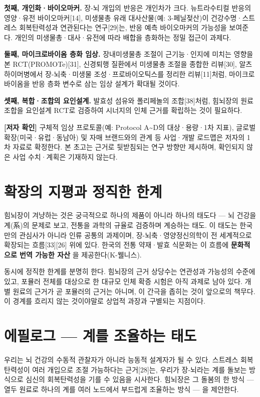 \documentclass[11pt,oneside]{book}
\newenvironment{authnote}
  {\par\smallskip\begingroup\leftskip=7mm\rightskip=5mm\small\color{muted}\noindent\ignorespaces}
  {\par\endgroup\smallskip}
\begin{document}
\textbf{첫째, 개인화·바이오마커.} 장-뇌 개입의 반응은 개인차가 크다. 뉴트라수티컬 반응의 영양·유전 바이오마커[14], 미생물총 유래 대사산물(예: 3-페닐젖산)이 건강수명·스트레스 회복탄력성과 연관된다는 연구[29]는, 반응 예측 바이오마커의 가능성을 보여준다. 개인의 미생물총·대사·유전에 따라 배합을 층화하는 정밀 접근이 과제다.

\textbf{둘째, 마이크로바이옴 층화 임상.} 장내미생물총 조절이 근기능·인지에 미치는 영향을 본 RCT(PROMOTe)[31], 신경퇴행 질환에서 미생물총 조절을 종합한 리뷰[30], 알츠하이머병에서 장-뇌축·미생물 조성·프로바이오틱스를 정리한 리뷰[11]처럼, 마이크로바이옴을 반응 층화 변수로 삼는 임상 설계가 확대될 것이다.

\textbf{셋째, 복합·조합의 요인설계.} 발효성 섬유와 폴리페놀의 조합[38]처럼, 힘뇌장의 원료 조합을 요인설계 RCT로 검증하여 시너지의 인체 근거를 확립하는 것이 필요하다.

\begin{authnote}\textbf{[저자 확인]} 구체적 임상 프로토콜(예: Protocol A\textasciitilde{}D의 대상·용량·1차 지표), 글로벌 확장(미국·유럽·동남아) 및 자매 브랜드와의 관계 등 사업·개발 로드맵은 저자의 1차 자료로 확정한다. 본 초고는 근거로 뒷받침되는 연구 방향만 제시하며, 확인되지 않은 사업 수치·계획은 기재하지 않는다.\end{authnote}
\section{확장의 지평과 정직한 한계}
힘뇌장이 겨냥하는 것은 궁극적으로 하나의 제품이 아니라 하나의 태도다 — 뇌 건강을 계(系)의 문제로 보고, 전통을 과학의 규율로 검증하며 계승하는 태도. 이 태도는 한국만의 관심사가 아니라 인류 공통의 과제이며, 장-뇌축·영양정신의학이 전 세계적으로 확장되는 흐름[33][26] 위에 있다. 한국의 전통 약재·발효 식문화는 이 흐름에 \textbf{문화적으로 번역 가능한 자산} 을 제공한다(K-웰니스).

동시에 정직한 한계를 분명히 한다. 힘뇌장의 근거 상당수는 연관성과 가능성의 수준에 있고, 포뮬러 전체를 대상으로 한 대규모 인체 확증 시험은 아직 과제로 남아 있다. 개별 원료의 근거가 곧 포뮬러의 근거는 아니며, 이 간극을 좁히는 것이 앞으로의 책무다. 이 경계를 흐리지 않는 것이야말로 상업적 과장과 구별되는 지점이다.

\section{에필로그 — 계를 조율하는 태도}
우리는 뇌 건강의 수동적 관찰자가 아니라 능동적 설계자가 될 수 있다. 스트레스 회복탄력성이 여러 개입으로 조절 가능하다는 근거[28]는, 우리가 장-뇌라는 계를 돌보는 방식으로 심신의 회복탄력성을 기를 수 있음을 시사한다. 힘뇌장은 그 돌봄의 한 방식 — 열두 원료로 하나의 계를 여러 노드에서 부드럽게 조율하는 방식 — 을 제안한다.
\end{document}

